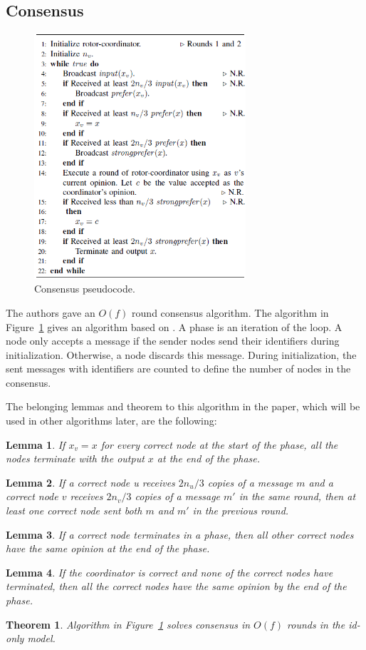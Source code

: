 \documentclass{article}
\newtheorem{theorem}{Theorem}[section]
\newtheorem{lemma}{Lemma}[section]
\begin{document}
\subsection{Consensus}
\begin{figure}[hbt!]
    \centering
    \includegraphics[width=0.70\textwidth]{figures/consensus.png}
    \caption{Consensus pseudocode.\label{consensus_fig}}
\end{figure}
The authors gave an \(O(f)\) round consensus algorithm. The algorithm in Figure~\ref{consensus_fig} gives an algorithm based on \cite{berman1992optimal}. A phase is an iteration of the loop. A node only accepts a message if the sender nodes send their identifiers during initialization. Otherwise, a node discards this message. During initialization, the sent messages with identifiers are counted to define the number of nodes in the consensus.

The belonging lemmas and theorem to this algorithm in the paper, which will be used in other algorithms later, are the following:
\begin{lemma}
If \(x_v = x\) for every correct node at the start of the phase, all the nodes terminate with the output \(x\) at the end of the phase.
\end{lemma}
\begin{lemma}
If a correct node u receives \(2n_u/3\) copies of a message \(m\) and a correct node \(v\) receives \(2n_v/3\) copies of a message \(m'\) in the same round, then at least one correct node sent both \(m\) and \(m'\) in the previous round.
\end{lemma}
\begin{lemma}
If a correct node terminates in a phase, then all other correct nodes have the same opinion at the end of the phase.
\end{lemma}
\begin{lemma}
If the coordinator is correct and none of the correct nodes have terminated, then all the correct nodes have the same opinion by the end of the phase.
\end{lemma}
\begin{theorem}
Algorithm in Figure~\ref{consensus_fig} solves consensus in \(O(f)\) rounds in the id-only model.
\end{theorem}
\end{document}
